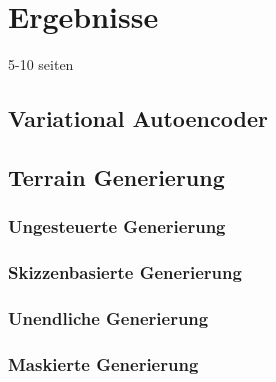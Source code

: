 \chapter{Ergebnisse}
5-10 seiten

\section {Variational Autoencoder}

\section {Terrain Generierung}
\subsection {Ungesteuerte Generierung}
\subsection {Skizzenbasierte Generierung}
\subsection {Unendliche Generierung}
\subsection {Maskierte Generierung}
